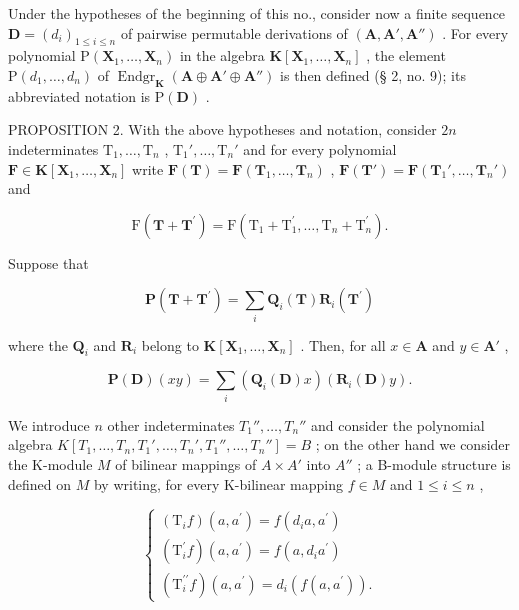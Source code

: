 Under the hypotheses of the beginning of this no., consider now a finite sequence \(\mathbf{D} = (d_i)_{1 \leqslant i \leqslant n}\) of pairwise permutable derivations of \((\mathbf{A}, \mathbf{A}', \mathbf{A}'')\) . For every polynomial \(\mathrm{P}(\mathbf{X}_1, \ldots, \mathbf{X}_n)\) in the algebra \(\mathbf{K}[\mathbf{X}_1, \ldots, \mathbf{X}_n]\) , the element \(\mathrm{P}(d_1, \ldots, d_n)\) of \(\operatorname{Endgr}_{\mathbf{K}}(\mathbf{A} \oplus \mathbf{A}' \oplus \mathbf{A}'')\) is then defined (§ 2, no. 9); its abbreviated notation is \(\mathrm{P}(\mathbf{D})\) .

PROPOSITION 2. With the above hypotheses and notation, consider \(2n\) indeterminates \(\mathrm{T}_1, \ldots, \mathrm{T}_n\) , \(\mathrm{T}_1', \ldots, \mathrm{T}_n'\) and for every polynomial \(\mathbf{F} \in \mathbf{K}[\mathbf{X}_1, \ldots, \mathbf{X}_n]\) write \(\mathbf{F}(\mathbf{T}) = \mathbf{F}(\mathbf{T}_1, \ldots, \mathbf{T}_n)\) , \(\mathbf{F}(\mathbf{T}') = \mathbf{F}(\mathbf{T}_1', \ldots, \mathbf{T}_n')\) and

\[
\mathrm{F} (\mathbf {T} + \mathbf {T} ^ {\prime}) = \mathrm{F} (\mathrm{T} _ {1} + \mathrm{T} _ {1} ^ {\prime}, \dots , \mathrm{T} _ {n} + \mathrm{T} _ {n} ^ {\prime}).
\]

Suppose that

\[
\mathbf {P} (\mathbf {T} + \mathbf {T} ^ {\prime}) = \sum_ {i} \mathbf {Q} _ {i} (\mathbf {T}) \mathbf {R} _ {i} (\mathbf {T} ^ {\prime})
\]

where the \(\mathbf{Q}_i\) and \(\mathbf{R}_i\) belong to \(\mathbf{K}[\mathbf{X}_1,\ldots ,\mathbf{X}_n]\) . Then, for all \(x\in \mathbf{A}\) and \(y\in \mathbf{A}'\) ,

\[
\mathbf {P} (\mathbf {D}) (x y) = \sum_ {i} \left(\mathbf {Q} _ {i} (\mathbf {D}) x\right) (\mathbf {R} _ {i} (\mathbf {D}) y).\tag{12}
\]

We introduce \(n\) other indeterminates \(T_1'', \ldots, T_n''\) and consider the polynomial algebra \(K[T_1, \ldots, T_n, T_1', \ldots, T_n', T_1'', \ldots, T_n''] = B\) ; on the other hand we consider the K-module \(M\) of bilinear mappings of \(A \times A'\) into \(A''\) ; a B-module structure is defined on \(M\) by writing, for every K-bilinear mapping \(f \in M\) and \(1 \leqslant i \leqslant n\) ,

\[
\left\{ \begin{array}{l} (\mathrm{T} _ {i} f) (a, a ^ {\prime}) = f (d _ {i} a, a ^ {\prime}) \\ (\mathrm{T} _ {i} ^ {\prime} f) (a, a ^ {\prime}) = f (a, d _ {i} a ^ {\prime}) \\ (\mathrm{T} _ {i} ^ {\prime \prime} f) (a, a ^ {\prime}) = d _ {i} (f (a, a ^ {\prime})). \end{array} \right.\tag{13}
\]

